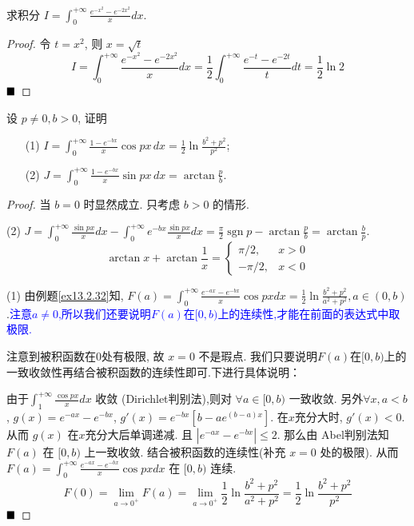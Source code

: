 \documentclass[lang=cn,newtx,10pt,scheme=chinese]{elegantbook}
\begin{document}
\begin{example}
求积分 $I = \int_{0}^{+\infty} \frac{e^{-x^2} - e^{-2x^2}}{x} dx$.
\end{example}

\begin{proof}
令 $t=x^2$, 则 $x=\sqrt{t}$
$$ I = \int_{0}^{+\infty} \frac{e^{-x^2} - e^{-2x^2}}{x} dx = \frac{1}{2} \int_{0}^{+\infty} \frac{e^{-t} - e^{-2t}}{t} dt = \frac{1}{2} \ln 2 $$
$\hfill \blacksquare$
\end{proof}

\begin{example}[$\bigstar \bigstar$]
设 $p \ne 0, b>0$, 证明
\begin{enumerate}
    \item[(1)] $I = \int_{0}^{+\infty} \frac{1-e^{-bx}}{x} \cos px \, dx = \frac{1}{2} \ln \frac{b^2+p^2}{p^2}$;
    \item[(2)] $J = \int_{0}^{+\infty} \frac{1-e^{-bx}}{x} \sin px \, dx = \arctan \frac{p}{b}$.
\end{enumerate}
\end{example}

\begin{proof}
当 $b=0$ 时显然成立. 只考虑 $b>0$ 的情形.

(2) $J = \int_0^{+\infty} \frac{\sin px}{x} dx - \int_0^{+\infty} e^{-bx} \frac{\sin px}{x} dx = \frac{\pi}{2} \operatorname{sgn} p - \arctan \frac{p}{b} = \arctan \frac{b}{p}$.
$$ \arctan x + \arctan \frac{1}{x} = \begin{cases} \pi/2, & x>0 \\ -\pi/2, & x<0 \end{cases} $$

(1) 由例题\ref{ex13.2.32}知, $F(a) = \int_{0}^{+\infty} \frac{e^{-ax}-e^{-bx}}{x} \cos px dx = \frac{1}{2} \ln \frac{b^2+p^2}{a^2+p^2}, a \in (0, b)$.\textcolor{blue}{注意$a \ne 0$,所以我们还要说明$F(a)$在$[0,b)$上的连续性,才能在前面的表达式中取极限.}

注意到被积函数在0处有极限, 故 $x=0$ 不是瑕点.
我们只要说明$F(a)$在$[0,b)$上的一致收敛性再结合被积函数的连续性即可.下进行具体说明：

由于$\int_1^{+\infty} \frac{\cos px}{x} dx$ 收敛 (Dirichlet判别法),则对 $\forall a \in [0,b)$ 一致收敛. 
另外$\forall x, a<b$, $g(x) = e^{-ax}-e^{-bx}$, $g'(x) = e^{-bx}[b-a e^{(b-a)x}]$. 在$x$充分大时, $g'(x) < 0$.
从而 $g(x)$ 在$x$充分大后单调递减. 且 $|e^{-ax}-e^{-bx}| \le 2$.
那么由 Abel判别法知 $F(a)$ 在 $[0,b)$ 上一致收敛. 结合被积函数的连续性(补充 $x=0$ 处的极限).
从而 $F(a) = \int_{0}^{+\infty} \frac{e^{-ax}-e^{-bx}}{x} \cos px dx$ 在 $[0,b)$ 连续. 
$$ F(0) = \lim\limits_{a\to 0^+} F(a) = \lim\limits_{a\to 0^+} \frac{1}{2} \ln \frac{b^2+p^2}{a^2+p^2} = \frac{1}{2} \ln \frac{b^2+p^2}{p^2} $$
$\hfill \blacksquare$
\end{proof}
\end{document}
